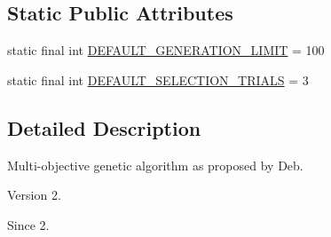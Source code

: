 \subsection*{Static Public Attributes}
\begin{DoxyCompactItemize}
\item 
static final int \hyperlink{classjenes_1_1algorithms_1_1_n_s_g_a2_3_01_t_01extends_01_chromosome_01_4_a63cad03fd3ef9a70933b35dbe043b4ea}{D\-E\-F\-A\-U\-L\-T\-\_\-\-G\-E\-N\-E\-R\-A\-T\-I\-O\-N\-\_\-\-L\-I\-M\-I\-T} = 100
\item 
static final int \hyperlink{classjenes_1_1algorithms_1_1_n_s_g_a2_3_01_t_01extends_01_chromosome_01_4_aa480c4702a4fbf2bb1ec8c8f9c7dc82b}{D\-E\-F\-A\-U\-L\-T\-\_\-\-S\-E\-L\-E\-C\-T\-I\-O\-N\-\_\-\-T\-R\-I\-A\-L\-S} = 3
\end{DoxyCompactItemize}


\subsection{Detailed Description}
Multi-\/objective genetic algorithm as proposed by Deb.

\begin{DoxyVersion}{Version}
2. 
\end{DoxyVersion}
\begin{DoxySince}{Since}
2. 
\end{DoxySince}


